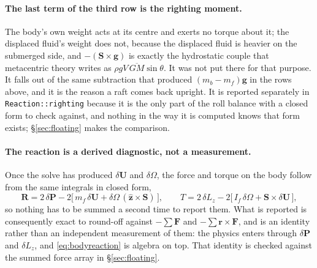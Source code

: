 \documentclass[11pt,a4paper]{article}
\newcommand{\code}[1]{\texttt{\small #1}}
\begin{document}
\paragraph{The last term of the third row is the righting moment.} The body's own
weight acts at its centre and exerts no torque about it; the displaced fluid's
weight does not, because the displaced fluid is heavier on the submerged side,
and $-(\bm{S}\times\bm{g})$ is exactly the hydrostatic couple that metacentric
theory writes as $\rho g V\,\overline{GM}\sin\theta$. It was not put there for
that purpose. It falls out of the same subtraction that produced $(m_b-m_f)\bm{g}$
in the rows above, and it is the reason a raft comes back upright. It is reported
separately in \code{Reaction::righting} because it is the only part of the roll
balance with a closed form to check against, and nothing in the way it is
computed knows that form exists; \S\ref{sec:floating} makes the comparison.

\paragraph{The reaction is a derived diagnostic, not a measurement.} Once the
solve has produced $\delta\bm{U}$ and $\delta\Omega$, the force and torque on the
body follow from the same integrals in closed form,
\begin{equation}
  \bm{R} = 2\,\delta\bm{P}
    - 2\big[\,m_f\,\delta\bm{U} + \delta\Omega\,(\hat{\bm{z}}\times\bm{S})\,\big],
  \qquad
  T = 2\,\delta L_z
    - 2\big[\,I_f\,\delta\Omega + \bm{S}\times\delta\bm{U}\,\big],
  \label{eq:bodyreaction}
\end{equation}
so nothing has to be summed a second time to report them. What is reported is
consequently exact to round-off against $-\sum\bm{F}$ and $-\sum\bm{r}\times\bm{F}$,
and is an identity rather than an independent measurement of them: the physics
enters through $\delta\bm{P}$ and $\delta L_z$, and \eqref{eq:bodyreaction} is
algebra on top. That identity is checked against the summed force array in
\S\ref{sec:floating}.
\end{document}
